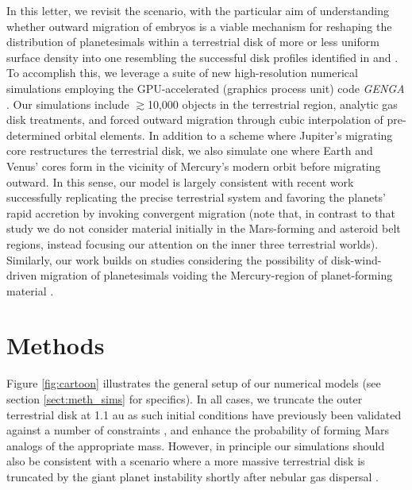 \documentclass[trackchanges,twocolumn]{aastex}
\begin{document}
In this letter, we revisit the \citet{ray16} scenario, with the particular aim of understanding whether outward migration of embryos is a viable mechanism for reshaping the distribution of planetesimals within a terrestrial disk of more or less uniform surface density into one resembling the successful disk profiles identified in \citet{clement21_merc3} and \citet{clement21_merc2}.  To accomplish this, we leverage a suite of new high-resolution numerical simulations employing the GPU-accelerated (graphics process unit) code \textit{GENGA} \citep{genga}.  Our simulations include $\gtrsim$10,000 objects in the terrestrial region, analytic gas disk treatments, and forced outward migration through cubic interpolation of pre-determined orbital elements.  In addition to a scheme where Jupiter's migrating core restructures the terrestrial disk, we also simulate one where Earth and Venus' cores form in the vicinity of Mercury's modern orbit before migrating outward.  In this sense, our model is largely consistent with recent work \citep{broz21} successfully replicating the precise terrestrial system and favoring the planets' rapid accretion by invoking convergent migration (note that, in contrast to that study we do not consider material initially in the Mars-forming and asteroid belt regions, instead focusing our attention on the inner three terrestrial worlds).  Similarly, our work builds on studies considering the possibility of disk-wind-driven migration of planetesimals voiding the Mercury-region of planet-forming material \citep{ogihara18}.

\section{Methods}
\label{sect:meth_setup}

Figure \ref{fig:cartoon} illustrates the general setup of our numerical models (see section \ref{sect:meth_sims} for specifics).  In all cases, we truncate the outer terrestrial disk at 1.1 au \citep[e.g.:][]{hansen09} as such initial conditions have previously been validated against a number of constraints \citep[e.g.:][]{walsh11,ray18_rev}, and enhance the probability of forming Mars analogs of the appropriate mass.  However, in principle our simulations should also be consistent with a scenario where a more massive terrestrial disk is truncated by the giant planet instability shortly after nebular gas dispersal \citep{clement18}.
\end{document}

